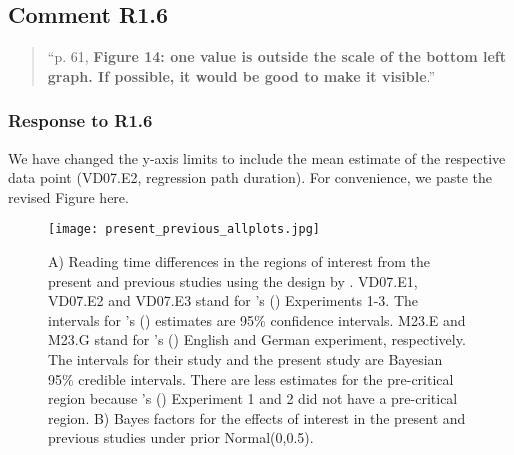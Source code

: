 \documentclass[12pt]{article}
\begin{document}
\subsection*{Comment R1.6}

\begin{quote}
``p. 61, \textbf{Figure 14: one value is outside the scale of the bottom left graph. If possible, it would be good to make it visible}.''
\end{quote}

\subsubsection*{Response to R1.6}
We have changed the y-axis limits to include the mean estimate of the respective data point (VD07.E2, regression path duration). For convenience, we paste the revised Figure here.

\setcounter{figure}{13}
\begin{sidewaysfigure}[htpb]
    \caption{A) Reading time differences in the regions of interest from the present and previous studies using the design by \cite{vandyke07}. VD07.E1, VD07.E2 and VD07.E3 stand for \citeauthor{vandyke07}'s (\citeyear{vandyke07}) Experiments 1-3. The intervals for \citeauthor{vandyke07}'s (\citeyear{vandyke07}) estimates are 95\% confidence intervals. M23.E and M23.G stand for \citeauthor{mertzen}'s (\citeyear{mertzen}) English and German experiment, respectively. The intervals for their study and the present study are Bayesian 95\% credible intervals. There are less estimates for the pre-critical region because \citeauthor{vandyke07}'s (\citeyear{vandyke07}) Experiment 1 and 2 did not have a pre-critical region. B) Bayes factors for the effects of interest in the present and previous studies under prior Normal(0,0.5).}
    \label{fig:previous_vs_present}
    \centering
    \texttt{[image: present\_previous\_allplots.jpg]}
\end{sidewaysfigure}
\clearpage
\end{document}
